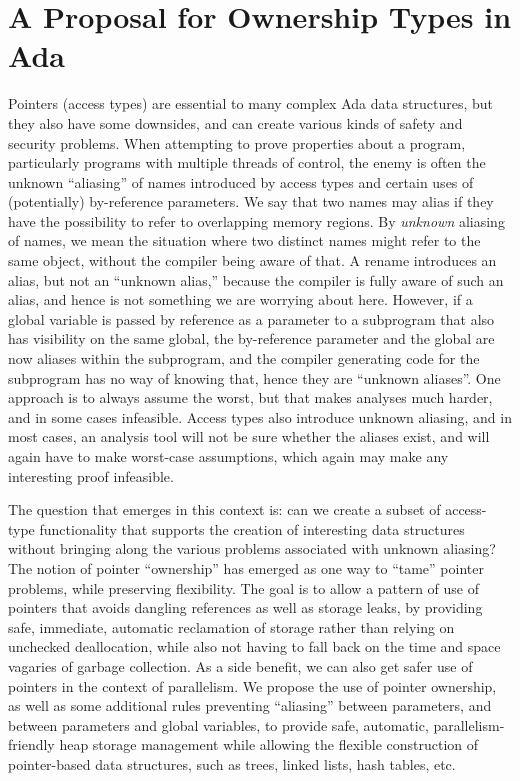 \documentclass{llncs}
\begin{document}
\section{A Proposal for Ownership Types in Ada}
Pointers (access types) are essential to many complex Ada data structures, but they also have some downsides, and can create various kinds of safety and security problems.
When attempting to prove properties about a program, particularly programs with multiple threads of control, the enemy is often the unknown ``aliasing'' of names introduced by
access types and certain uses of (potentially) by-reference parameters. We say that two names may alias if they have the possibility to refer to overlapping memory regions.
By \textit{unknown} aliasing of names, we mean the situation where two distinct names might refer to the same object, without the compiler being aware of that.  A rename introduces
an alias, but not an ``unknown alias,'' because the compiler is fully aware of such an alias, and hence is not something we are worrying about here. However, if a global
variable is passed by reference as a parameter to a subprogram that also has visibility on the same global, the by-reference parameter and the global are now aliases within
the subprogram, and the compiler generating code for the subprogram has no way of knowing that, hence they are ``unknown aliases''.  One approach is to always assume the worst,
but that makes analyses much harder, and in some cases infeasible. Access types also introduce unknown aliasing, and in most cases, an analysis tool will not be
sure whether the aliases exist, and will again have to make worst-case assumptions, which again may make any interesting proof infeasible.

\smallskip
The question that emerges in this context is: can we create a subset of access-type functionality that supports the creation of interesting data structures without bringing along
the various problems associated with unknown aliasing? The notion of pointer ``ownership'' has emerged as one way to ``tame'' pointer problems, while preserving flexibility.  The goal is to allow a pattern of use
of pointers that avoids dangling references as well as storage leaks, by providing safe, immediate, automatic reclamation of storage rather than relying on unchecked deallocation,
while also not having to fall back on the time and space vagaries of garbage collection.  As a side benefit, we can also get safer use of pointers in the context of parallelism.
We propose the use of pointer ownership, as well as some additional rules preventing ``aliasing'' between parameters, and between parameters and global variables, to provide safe,
automatic, parallelism-friendly heap storage management while allowing the flexible construction of pointer-based data structures, such as trees, linked lists, hash tables, etc.
\end{document}
